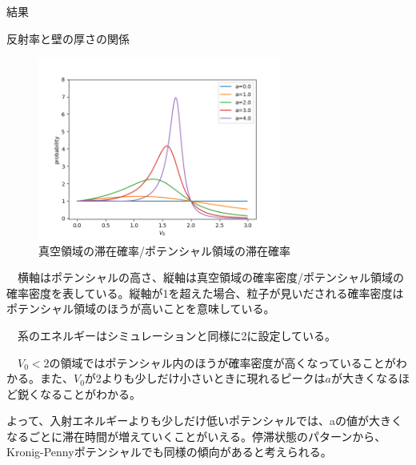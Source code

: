 \documentclass[a4paper, lualatex]{bxjsarticle}
\begin{document}
\begin{section}{結果}
\begin{subsection}{反射率と壁の厚さの関係}
     \begin{figure}[h]
        \centering
        \includegraphics[width=8cm]{hako_in.png}
        \caption{真空領域の滞在確率/ポテンシャル領域の滞在確率}
    \end{figure}
    \par　横軸はポテンシャルの高さ、縦軸は真空領域の確率密度/ポテンシャル領域の確率密度を表している。縦軸が1を超えた場合、粒子が見いだされる確率密度はポテンシャル領域のほうが高いことを意味している。
    \par　系のエネルギーはシミュレーションと同様に2に設定している。
    \par　$V_0<2$の領域ではポテンシャル内のほうが確率密度が高くなっていることがわかる。また、$V_0$が2よりも少しだけ小さいときに現れるピークは$a$が大きくなるほど鋭くなることがわかる。
    \par よって、入射エネルギーよりも少しだけ低いポテンシャルでは、aの値が大きくなるごとに滞在時間が増えていくことがいえる。停滞状態のパターンから、Kronig-Pennyポテンシャルでも同様の傾向があると考えられる。
    \end{subsection}
\end{section}
\newpage
\appendix
\end{document}
